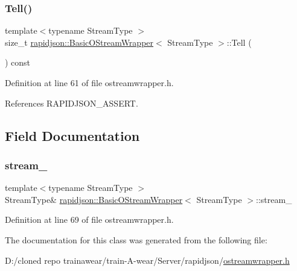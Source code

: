 \subsubsection{\texorpdfstring{Tell()}{Tell()}}
{\footnotesize\ttfamily template$<$typename Stream\+Type $>$ \\
size\+\_\+t \mbox{\hyperlink{classrapidjson_1_1_basic_o_stream_wrapper}{rapidjson\+::\+Basic\+O\+Stream\+Wrapper}}$<$ Stream\+Type $>$\+::Tell (\begin{DoxyParamCaption}{ }\end{DoxyParamCaption}) const}



Definition at line 61 of file ostreamwrapper.\+h.


\begin{DoxyCode}{0}

\end{DoxyCode}


References R\+A\+P\+I\+D\+J\+S\+O\+N\+\_\+\+A\+S\+S\+E\+RT.



\subsection{Field Documentation}
\mbox{\label{classrapidjson_1_1_basic_o_stream_wrapper_a35af4b2c8ccfb61d87200d57e6f17076}} 
\subsubsection{\texorpdfstring{stream\_}{stream\_}}
{\footnotesize\ttfamily template$<$typename Stream\+Type $>$ \\
Stream\+Type\& \mbox{\hyperlink{classrapidjson_1_1_basic_o_stream_wrapper}{rapidjson\+::\+Basic\+O\+Stream\+Wrapper}}$<$ Stream\+Type $>$\+::stream\+\_\+\hspace{0.3cm}{\ttfamily [private]}}



Definition at line 69 of file ostreamwrapper.\+h.



The documentation for this class was generated from the following file\+:\begin{DoxyCompactItemize}
\item 
D\+:/cloned repo trainawear/train-\/\+A-\/wear/\+Server/rapidjson/\mbox{\hyperlink{ostreamwrapper_8h}{ostreamwrapper.\+h}}\end{DoxyCompactItemize}
